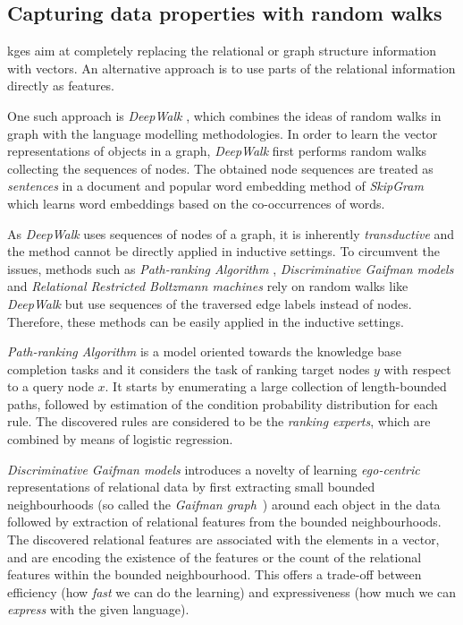 \subsection{Capturing data properties with random walks}


\gls{kge}s aim at completely replacing the relational or graph structure information with vectors.
An alternative approach is to use parts of the relational information directly as features.


One such approach is \textit{DeepWalk} \cite{Perozzi:2014:DOL:2623330.2623732}, which combines the ideas of random walks in graph with the language modelling methodologies.
In order to learn the vector representations of objects in a graph, \textit{DeepWalk} first performs random walks collecting the sequences of nodes.
The obtained node sequences are treated as \textit{sentences} in a document and popular word embedding method of  \textit{SkipGram} \cite{NIPS2013_Skipgram} which learns word embeddings based on the co-occurrences of words.



As \textit{DeepWalk} uses sequences of nodes of a graph, it is inherently \textit{transductive} and the method cannot be directly applied in inductive settings.
To circumvent the issues, methods such as \textit{Path-ranking Algorithm} \cite{lao2010pra,Lao:2011:RWI:2145432.2145494}, \textit{Discriminative Gaifman models} \cite{Niepert:2016:DGM:3157382.3157479} and \textit{Relational Restricted Boltzmann machines} \cite{KaurILP17} rely on random walks like \textit{DeepWalk} but use sequences of the traversed edge labels instead of nodes.
Therefore, these methods can be easily applied in the inductive settings.



\textit{Path-ranking Algorithm} is a model oriented towards the knowledge base completion tasks and it considers the task of ranking target nodes $y$ with respect to a query node $x$.
It starts by enumerating a large collection of length-bounded paths, followed by estimation of the condition probability distribution for each rule.
The discovered rules are considered to be the \textit{ranking experts}, which are combined by means of logistic regression.




\textit{Discriminative Gaifman models} introduces a novelty of learning \textit{ego-centric} representations of relational data by first extracting small bounded neighbourhoods (so called the \textit{Gaifman graph}~\cite{GAIFMAN1982105}) around each object in the data followed by extraction of relational features from the bounded neighbourhoods.
The discovered relational features are associated with the elements in a vector, and are encoding the existence of the features or the count of the relational features within the bounded neighbourhood.
This offers a trade-off between efficiency (how \textit{fast} we can do the learning) and expressiveness (how much we can \textit{express} with the given language).



